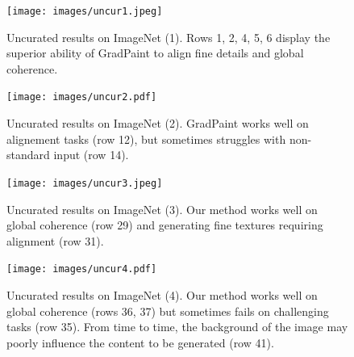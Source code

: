 \begin{figure}[htbp]
  \centering
    \texttt{[image: images/uncur1.jpeg]}
    \caption{Uncurated results on ImageNet (1). Rows 1, 2, 4, 5, 6 display the superior ability of GradPaint to align fine details and global coherence.}
    \label{fig:uncur1}
\end{figure}

\begin{figure}[htbp]
  \centering
    \texttt{[image: images/uncur2.pdf]}
    \caption{Uncurated results on ImageNet (2). GradPaint works well on alignement tasks (row 12), but sometimes struggles with non-standard input (row 14). }
    \label{fig:uncur2}
\end{figure}

\begin{figure}[htbp]
  \centering
    \texttt{[image: images/uncur3.jpeg]}
    \caption{Uncurated results on ImageNet (3). Our method works well on global coherence (row 29) and generating fine textures requiring alignment (row 31).}
    \label{fig:uncur3}
\end{figure}

\begin{figure}[htbp]
  \centering
    \texttt{[image: images/uncur4.pdf]}
    \caption{Uncurated results on ImageNet (4). Our method works well on global coherence (rows 36, 37) but sometimes fails on challenging tasks (row 35). From time to time, the background of the image may poorly influence the content to be generated (row 41).}
    \label{fig:uncur4}
\end{figure}
